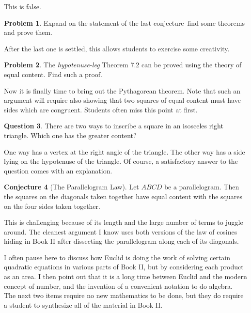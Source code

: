 \documentclass{tufte-handout}
\theoremstyle{definition}
\newtheorem{problem}{Problem}[section]
\newtheorem{conjecture}[problem]{Conjecture}
\newtheorem{question}[problem]{Question}
\begin{document}
This is false.

\begin{problem}\label{prob:expand-false-area}
Expand on the statement of the last conjecture--find some theorems and prove them.
\end{problem}

After the last one is settled, this allows students to exercise some creativity.

\begin{problem}\label{prob:RASS-area} 
The \emph{hypotenuse-leg} Theorem 7.2 can be proved using the theory of equal content. Find such a proof.
\end{problem}

Now it is finally time to bring out the Pythagorean theorem. Note that such an argument will require also showing that two squares of equal content must have sides which are congruent. Students often miss this point at first.

\begin{question}
There are two ways to inscribe a square in an isosceles right triangle. Which one has the greater content?
\end{question}

One way has a vertex at the right angle of the triangle. The other way has a side lying on the hypotenuse of the triangle. Of course, a satisfactory answer to the question comes with an explanation.

\begin{conjecture}[The Parallelogram Law]\label{conj:parallelogram-law}
Let $ABCD$ be a parallelogram. Then the squares on the diagonals taken together have equal content with the squares on the four sides taken together.
\end{conjecture}

This is challenging because of its length and the large number of terms to juggle around. The cleanest argument I know uses both versions of the law of cosines hiding in Book II after dissecting the parallelogram along each of its diagonals.

I often pause here to discuss how Euclid is doing the work of solving certain quadratic equations in various parts of Book II, but by considering each product as an area. I then point out that it is a long time between Euclid and the modern concept of number, and the invention of a convenient notation to do algebra.\\


The next two items require no new mathematics to be done, but they do require a student to synthesize all of the material in Book II. 
\end{document}
